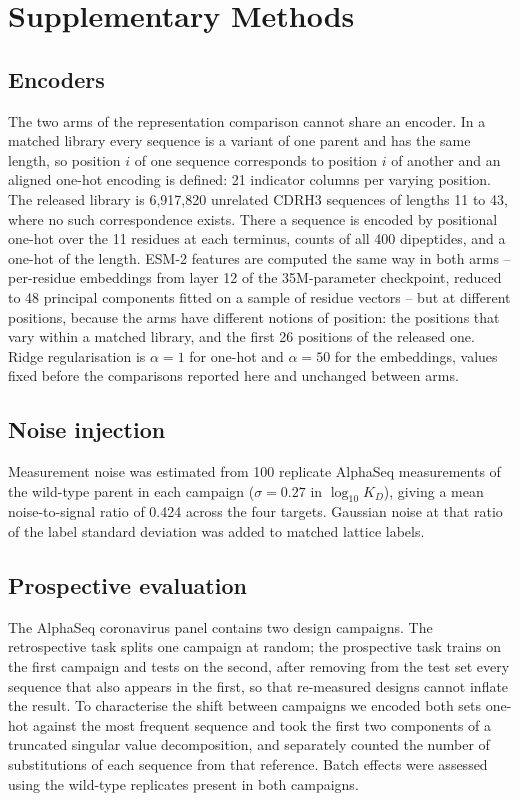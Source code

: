 \documentclass[11pt,a4paper]{article}
\begin{document}
\clearpage

\section*{Supplementary Methods}

\subsection*{Encoders}

The two arms of the representation comparison cannot share an encoder. In a
matched library every sequence is a variant of one parent and has the same
length, so position $i$ of one sequence corresponds to position $i$ of another
and an aligned one-hot encoding is defined: 21 indicator columns per varying
position. The released library is 6{,}917{,}820 unrelated CDRH3 sequences of
lengths 11 to 43, where no such correspondence exists. There a sequence is
encoded by positional one-hot over the 11 residues at each terminus, counts of
all 400 dipeptides, and a one-hot of the length. ESM-2 features are computed
the same way in both arms -- per-residue embeddings from layer 12 of the
35M-parameter checkpoint, reduced to 48 principal components fitted on a sample
of residue vectors -- but at different positions, because the arms have
different notions of position: the positions that vary within a matched
library, and the first 26 positions of the released one. Ridge regularisation is $\alpha = 1$ for one-hot and $\alpha = 50$ for
the embeddings, values fixed before the comparisons reported here and unchanged
between arms.

\subsection*{Noise injection}

Measurement noise was estimated from 100 replicate AlphaSeq measurements of the
wild-type parent in each campaign ($\sigma = 0.27$ in $\log_{10} K_D$), giving
a mean noise-to-signal ratio of 0.424 across the four targets. Gaussian noise
at that ratio of the label standard deviation was added to matched lattice
labels.

\subsection*{Prospective evaluation}

The AlphaSeq coronavirus panel contains two design campaigns. The retrospective
task splits one campaign at random; the prospective task trains on the first
campaign and tests on the second, after removing from the test set every
sequence that also appears in the first, so that re-measured designs cannot
inflate the result. To characterise the shift between campaigns we encoded both
sets one-hot against the most frequent sequence and took the first two
components of a truncated singular value decomposition, and separately counted
the number of substitutions of each sequence from that reference. Batch effects
were assessed using the wild-type replicates present in both campaigns.
\end{document}
